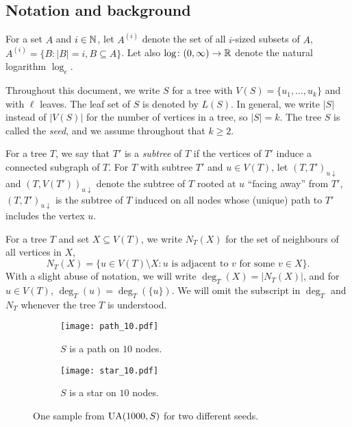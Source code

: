 \subsection{Notation and background}

For a set $A$ and $i \in \mathbb{N}$, let $A^{(i)}$ denote the set of all
$i$-sized subsets of $A$, \ie
$A^{(i)} = \{ B \colon |B| = i, B \subseteq A\}$.  Let also
$\log \colon (0, \infty) \to \mathbb{R}$ denote the natural logarithm
$\log_e$.

Throughout this document, we write $S$ for a tree with
$V(S) = \{u_1, \dots, u_k\}$ and with $\ell$ leaves. The leaf set of
$S$ is denoted by $L(S)$. In general, we write $|S|$ instead of
$|V(S)|$ for the number of vertices in a tree, so $|S| = k$. The tree
$S$ is called the \emph{seed}, and we assume throughout that
$k \ge 2$.

For a tree $T$, we say that $T'$ is a \emph{subtree} of $T$ if the
vertices of $T'$ induce a connected subgraph of $T$. For $T$ with
subtree $T'$ and $u \in V(T)$, let $(T, T')_{u \downarrow}$ and
$(T, V(T'))_{u \downarrow}$ denote the subtree of $T$ rooted at $u$
``facing away'' from $T'$, \ie $(T, T')_{u \downarrow}$ is the subtree
of $T$ induced on all nodes whose (unique) path to $T'$ includes the
vertex $u$.

For a tree $T$ and set $X \subseteq V(T)$, we write $N_T(X)$ for the set
of neighbours of all vertices in $X$, \ie
\[
  N_T(X) = \{u \in V(T) \setminus X \colon u \text{ is adjacent to $v$ for some $v \in X$} \} .
\]
With a slight abuse of notation, we will write $\deg_T(X) = |N_T(X)|$,
and for $u \in V(T)$, $\deg_T(u) = \deg_T(\{u\})$. We will omit the
subscript in $\deg_T$ and $N_T$ whenever the tree $T$ is understood.

\begin{figure}
  \centering
  \begin{subfigure}[b]{0.45\textwidth}
    \centering
    \texttt{[image: path\_10.pdf]}
    \caption{$S$ is a path on $10$ nodes.}
  \end{subfigure}
  \begin{subfigure}[b]{0.45\textwidth}
    \centering
    \texttt{[image: star\_10.pdf]}
    \caption{$S$ is a star on $10$ nodes.}
  \end{subfigure}
  \caption{One sample from $\operatorname{UA}(1000, S)$ for two different seeds.}
\end{figure}

